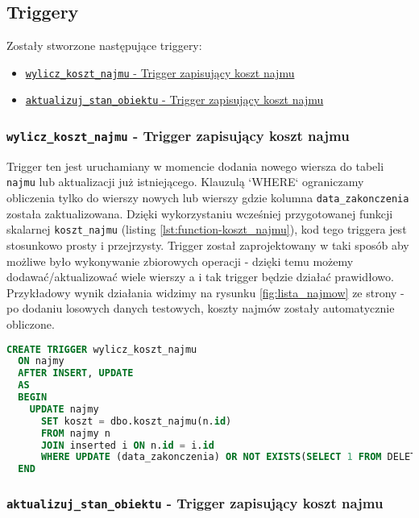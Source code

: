 \subsection{Triggery}

Zostały stworzone następujące triggery:
\begin{itemize}
	\item \href{run:Sources/SQL/5. Triggery/019_Utworzenie_triggeru_aktualizujacego_koszt_najmu.sql}{\texttt{wylicz\_koszt\_najmu} - Trigger zapisujący koszt najmu}
	\item \href{run:Sources/SQL/5. Triggery/036_Utworzenie_triggeru_aktualizujacego_stan_obiekty.sql}{\texttt{aktualizuj\_stan\_obiektu} - Trigger zapisujący koszt najmu}
\end{itemize}

\subsubsection{\texttt{wylicz\_koszt\_najmu} - Trigger zapisujący koszt najmu}

Trigger ten jest uruchamiany w momencie dodania nowego wiersza do tabeli \texttt{najmu} lub aktualizacji już istniejącego. Klauzulą `WHERE` ograniczamy obliczenia tylko do wierszy nowych lub wierszy gdzie kolumna \texttt{data\_zakonczenia} została zaktualizowana. Dzięki wykorzystaniu wcześniej przygotowanej funkcji skalarnej \texttt{koszt\_najmu} (listing \ref{lst:function-koszt_najmu}), kod tego triggera jest stosunkowo prosty i przejrzysty. Trigger został zaprojektowany w taki sposób aby możliwe było wykonywanie zbiorowych operacji - dzięki temu możemy dodawać/aktualizować wiele wierszy a i tak trigger będzie działać prawidłowo. Przykładowy wynik działania widzimy na rysunku \ref{fig:lista_najmow} ze strony \pageref{fig:lista_najmow} - po dodaniu losowych danych testowych, koszty najmów zostały automatycznie obliczone.

\begin{lstlisting}[language=SQL, caption={Skrypt tworzący trigger \texttt{wylicz\_koszt\_najmu}}, label={lst:trigger-wylicz_koszt_najmu}]
CREATE TRIGGER wylicz_koszt_najmu
  ON najmy
  AFTER INSERT, UPDATE
  AS
  BEGIN
    UPDATE najmy
      SET koszt = dbo.koszt_najmu(n.id)
      FROM najmy n
      JOIN inserted i ON n.id = i.id
      WHERE UPDATE (data_zakonczenia) OR NOT EXISTS(SELECT 1 FROM DELETED)
  END
\end{lstlisting}


\subsubsection{\texttt{aktualizuj\_stan\_obiektu} - Trigger zapisujący koszt najmu}

